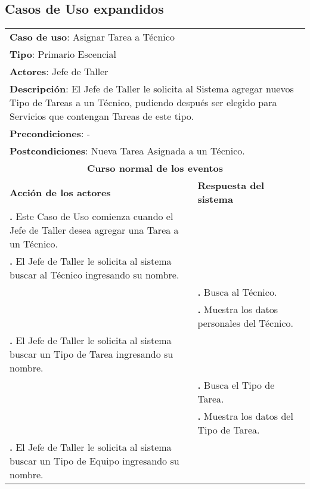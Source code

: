 \documentclass[12pt]{extarticle}
\begin{document}
    \subsection{Casos de Uso expandidos}

    \newcommand\inc{\stepcounter{step}\textbf{\thestep. }}
    \newcommand\resetinc{\setcounter{step}{0}}
    
    \newcommand\raya{\noindent\rule{169mm}{0.8mm}\\}

	\begin{longtable}{ |p{8cm}|p{8cm}| }
		\hline
		\multicolumn{2}{|p{16cm}|}{\textbf{Caso de uso}: Asignar Tarea a Técnico}\\
		\multicolumn{2}{|p{16cm}|}{\textbf{Tipo}: Primario Escencial}\\
		\multicolumn{2}{|p{16cm}|}{\textbf{Actores}: Jefe de Taller}\\
		\multicolumn{2}{|p{16cm}|}{\textbf{Descripción}: El Jefe de Taller le solicita al Sistema agregar nuevos Tipo de Tareas a un Técnico, pudiendo después ser elegido para Servicios que contengan Tareas de este tipo.}\\
		\multicolumn{2}{|p{16cm}|}{\textbf{Precondiciones}: - }\\
		\multicolumn{2}{|p{16cm}|}{\textbf{Postcondiciones}: Nueva Tarea Asignada a un Técnico.}\\
		\hline
		\multicolumn{2}{|c|}{\textbf{Curso normal de los eventos}}\\
		\hline
		\textbf{Acción de los actores} & \textbf{Respuesta del sistema}\\
		\hline
			\inc Este Caso de Uso comienza cuando el Jefe de Taller desea agregar una Tarea a un Técnico.& \\
			\hline
			\inc  El Jefe de Taller le solicita al sistema buscar al Técnico ingresando su nombre.& \\
			\hline
			& \inc Busca al Técnico. \\
			\hline
            & \inc Muestra los datos personales del Técnico. \\
			\hline
			\inc El Jefe de Taller le solicita al sistema buscar un Tipo de Tarea ingresando su nombre. & \\
			\hline
			& \inc Busca el Tipo de Tarea. \\
			\hline
			& \inc Muestra los datos del Tipo de Tarea. \\
			\hline
			\inc  El Jefe de Taller le solicita al sistema buscar un Tipo de Equipo ingresando su nombre. & \\

\end{longtable}
\end{document}
